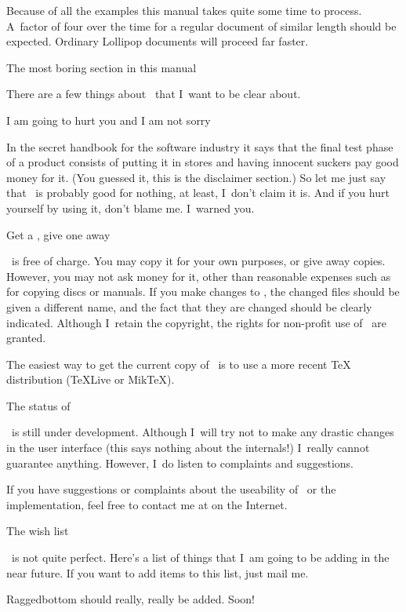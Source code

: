 Because of all the examples this manual takes quite some time to
process. A~factor of four over the time for a regular document of
similar length should be expected. Ordinary Lollipop documents will
proceed far faster.

\Section The most boring section in this manual

There are a few things about \Lollipop\ that I~want to be clear about.

\SubSection I am going to hurt you and I am not sorry

In the secret handbook for the software industry it says that the
final test phase of a product consists of putting it in stores and
having innocent suckers pay good money for it. (You guessed it, this
is the disclaimer section.) So let me just say that 
\Lollipop\ is probably good for nothing, at least, I~don't claim it
is. And if you hurt yourself by using it, don't blame me. I~warned
you.

\SubSection Get a \Lollipop, give one away

\Lollipop\ is free of charge. You may copy it
for your own purposes, or give away copies. However, you may not ask
money for it, other than reasonable expenses such as for copying discs
or manuals. If you make changes to \Lollipop, the changed files
should be given a different name, and the fact that they are changed
should be clearly indicated. Although I~retain the copyright, the
rights for non-profit use of \Lollipop\ are granted.

The easiest way to get the current copy of \Lollipop\ is to use
a more recent \TeX{} distribution (\TeX Live or Mik\TeX).

\SubSection The status of \Lollipop

\Lollipop\ is still under development. Although I~will try not to
make any drastic changes in the user interface (this says nothing
about the internals!) I~really cannot guarantee anything.
However, I~do listen to complaints and suggestions. 

If you have suggestions or complaints about the
useability of \Lollipop\ or the implementation, feel free to contact
me at  on the Internet. 

 The wish list

\Lollipop\ is not quite perfect. Here's a list of things that I~am
going to be adding in the near future. If you want to add items to
this list, just mail me.

\Enumerate\item Raggedbottom should really, really be added. Soon!

